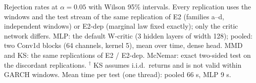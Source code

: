 Rejection rates at $\alpha=0.05$ with Wilson 95\% intervals. Every replication uses the windows and the test stream of the same replication of E2 (families a--d, independent windows) or E2-dep (marginal law fixed exactly); only the critic network differs. MLP: the default W-critic (3 hidden layers of width 128); pooled: two Conv1d blocks (64 channels, kernel 5), mean over time, dense head. MMD and KS: the same replications of E2 / E2-dep. McNemar: exact two-sided test on the discordant replications. $^{\dagger}$ KS assumes i.i.d.\ returns and is not valid within GARCH windows. Mean time per test (one thread): pooled 66 s, MLP 9 s.
